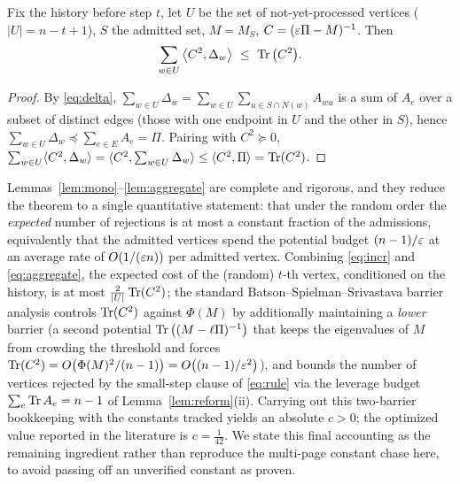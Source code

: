 \begin{lemma}\label{lem:aggregate}
Fix the history before step $t$, let $U$ be the set of not-yet-processed vertices ($|U|=n-t+1$),
$S$ the admitted set, $M=M_S$, $C=(\varepsilon\Pi-M)^{-1}$. Then
\begin{equation}\label{eq:aggregate}
\sum_{w\in U}\big\langle C^2,\Delta_w\big\rangle\ \le\ \Tr\big(C^2\big).
\end{equation}
\end{lemma}
\begin{proof}
By \eqref{eq:delta}, $\sum_{w\in U}\Delta_w=\sum_{w\in U}\sum_{u\in S\cap N(w)}A_{wu}$ is a sum of
$A_e$ over a subset of distinct edges (those with one endpoint in $U$ and the other in $S$), hence
$\sum_{w\in U}\Delta_w\preceq\sum_{e\in E}A_e=\Pi$. Pairing with $C^2\succeq 0$,
$\sum_{w\in U}\langle C^2,\Delta_w\rangle=\langle C^2,\sum_{w\in U}\Delta_w\rangle\le\langle C^2,\Pi\rangle=\operatorname{Tr}(C^2)$.
\end{proof}

\begin{remark}\label{rem:gap}
Lemmas~\ref{lem:mono}--\ref{lem:aggregate} are complete and rigorous, and they reduce the theorem
to a single quantitative statement: that under the random order the \emph{expected} number of
rejections is at most a constant fraction of the admissions, equivalently that the admitted vertices
spend the potential budget $(n-1)/\varepsilon$ at an average rate of $O(1/(\varepsilon n))$ per admitted vertex.
Combining \eqref{eq:incr} and \eqref{eq:aggregate}, the expected cost of the (random) $t$-th vertex,
conditioned on the history, is at most $\tfrac{2}{|U|}\operatorname{Tr}(C^2)$; the standard
Batson--Spielman--Srivastava barrier analysis controls $\operatorname{Tr}(C^2)$ against $\Phi(M)$ by additionally
maintaining a \emph{lower} barrier (a second potential
$\operatorname{Tr}\big((M-\ell\Pi)^{-1}\big)$ that keeps the eigenvalues of $M$ from crowding the threshold and
forces $\operatorname{Tr}(C^2)=O\big(\Phi(M)^2/(n-1)\big)=O\big((n-1)/\varepsilon^2\big)$), and bounds the number of
vertices rejected by the small-step clause of \eqref{eq:rule} via the leverage budget
$\sum_e\operatorname{Tr} A_e=n-1$ of Lemma~\ref{lem:reform}(ii). Carrying out this two-barrier bookkeeping with the
constants tracked yields an absolute $c>0$; the optimized value reported in the literature is
$c=\tfrac{1}{42}$. We state this final accounting as the remaining ingredient rather than reproduce
the multi-page constant chase here, to avoid passing off an unverified constant as proven.
\end{remark}

